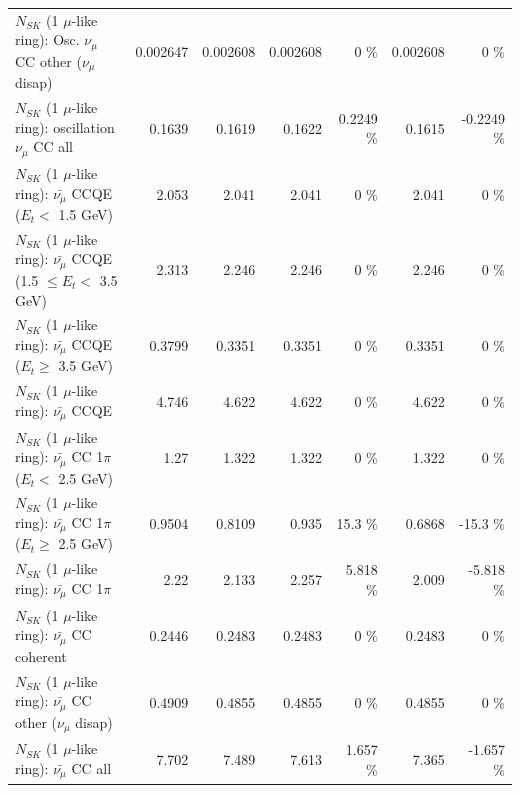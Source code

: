 \begin{table}
\begin{tabular}{| l | r | r | r  r | r  r |}
         $N_{SK}$ (1 $\mu$-like ring): Osc. $\nu_\mu$ CC other ($\nu_\mu$ disap) &        0.002647 &        0.002608 &        0.002608 &        0 \%  &        0.002608 &        0 \%  \\ 
                      $N_{SK}$ (1 $\mu$-like ring): oscillation $\nu_\mu$ CC all &          0.1639 &          0.1619 &          0.1622 &   0.2249 \%  &          0.1615 &  -0.2249 \%  \\ 
\hline
\hline
          $N_{SK}$ (1 $\mu$-like ring): $\bar{\nu_\mu}$ CCQE ($E_{t} <$ 1.5 GeV) &           2.053 &           2.041 &           2.041 &        0 \%  &           2.041 &        0 \%  \\ 
 $N_{SK}$ (1 $\mu$-like ring): $\bar{\nu_\mu}$ CCQE (1.5 $\leq E_{t} <$ 3.5 GeV) &           2.313 &           2.246 &           2.246 &        0 \%  &           2.246 &        0 \%  \\ 
       $N_{SK}$ (1 $\mu$-like ring): $\bar{\nu_\mu}$ CCQE ($E_{t} \geq$ 3.5 GeV) &          0.3799 &          0.3351 &          0.3351 &        0 \%  &          0.3351 &        0 \%  \\ 
\hline
                              $N_{SK}$ (1 $\mu$-like ring): $\bar{\nu_\mu}$ CCQE &           4.746 &           4.622 &           4.622 &        0 \%  &           4.622 &        0 \%  \\ 
\hline
     $N_{SK}$ (1 $\mu$-like ring): $\bar{\nu_\mu}$ CC 1$\pi$ ($E_{t} <$ 2.5 GeV) &            1.27 &           1.322 &           1.322 &        0 \%  &           1.322 &        0 \%  \\ 
  $N_{SK}$ (1 $\mu$-like ring): $\bar{\nu_\mu}$ CC 1$\pi$ ($E_{t} \geq$ 2.5 GeV) &          0.9504 &          0.8109 &           0.935 &     15.3 \%  &          0.6868 &    -15.3 \%  \\ 
\hline
                         $N_{SK}$ (1 $\mu$-like ring): $\bar{\nu_\mu}$ CC 1$\pi$ &            2.22 &           2.133 &           2.257 &    5.818 \%  &           2.009 &   -5.818 \%  \\ 
                       $N_{SK}$ (1 $\mu$-like ring): $\bar{\nu_\mu}$ CC coherent &          0.2446 &          0.2483 &          0.2483 &        0 \%  &          0.2483 &        0 \%  \\ 
        $N_{SK}$ (1 $\mu$-like ring): $\bar{\nu_\mu}$ CC other ($\nu_\mu$ disap) &          0.4909 &          0.4855 &          0.4855 &        0 \%  &          0.4855 &        0 \%  \\ 
                          $N_{SK}$ (1 $\mu$-like ring): $\bar{\nu_{\mu}}$ CC all &           7.702 &           7.489 &           7.613 &    1.657 \%  &           7.365 &   -1.657 \%  \\ 

\end{tabular}
\end{table}
